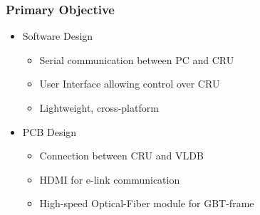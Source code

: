 \documentclass[aspectratio=43]{beamer}
\makeatletter
\newenvironment{backgroundblock}[2]{%
  \global\setbox\@backgroundblock=\vbox\bgroup%
    \unvbox\@backgroundblock%
    \vbox to0pt\bgroup\vskip#2\hbox to0pt\bgroup\hskip#1\relax%
}{\egroup\egroup\egroup}
\makeatother
\begin{document}
{



\begin{frame}
\frametitle{Primary Objective}

\begin{itemize}
\item Software Design
	\begin{itemize}
	\item Serial communication between PC and CRU
	\item User Interface allowing control over CRU
	\item Lightweight, cross-platform
	\end{itemize}
\item PCB Design
	\begin{itemize}
	\item Connection between CRU and VLDB 
	\item HDMI for e-link communication
	\item High-speed Optical-Fiber module for GBT-frame
	\end{itemize}
\end{itemize}


\end{frame}}
\end{document}
